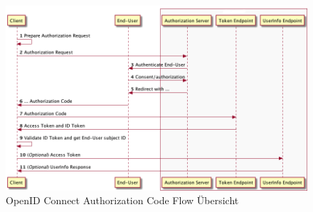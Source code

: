
\begin{figure}[!ht]
	\centering
	\includegraphics[width=1\textwidth]{Images/Ebert/AuthorizationCodeFlow.png}
	\caption{OpenID Connect Authorization Code Flow Übersicht \cite{EB12}}
	\label{fig:EB_AuthorizationCodeFlow}
\end{figure} %

